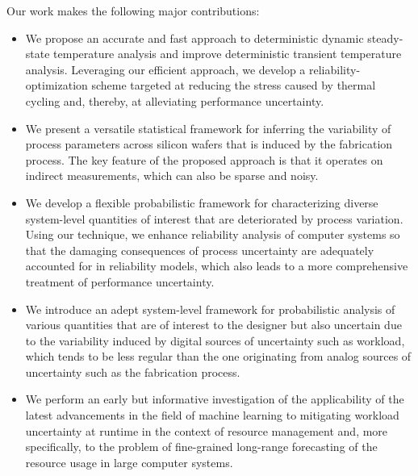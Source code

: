Our work makes the following major contributions:

\begin{itemize}

\item
We propose an accurate and fast approach to deterministic dynamic steady-state
temperature analysis and improve deterministic transient temperature analysis.
Leveraging our efficient approach, we develop a reliability-optimization scheme
targeted at reducing the stress caused by thermal cycling and, thereby, at
alleviating performance uncertainty.

\item
We present a versatile statistical framework for inferring the variability of
process parameters across silicon wafers that is induced by the fabrication
process. The key feature of the proposed approach is that it operates on
indirect measurements, which can also be sparse and noisy.

\item
We develop a flexible probabilistic framework for characterizing diverse
system-level quantities of interest that are deteriorated by process variation.
Using our technique, we enhance reliability analysis of computer systems so that
the damaging consequences of process uncertainty are adequately accounted for in
reliability models, which also leads to a more comprehensive treatment of
performance uncertainty.

\item
We introduce an adept system-level framework for probabilistic analysis of
various quantities that are of interest to the designer but also uncertain due
to the variability induced by digital sources of uncertainty such as workload,
which tends to be less regular than the one originating from analog sources of
uncertainty such as the fabrication process.

\item
We perform an early but informative investigation of the applicability of the
latest advancements in the field of machine learning to mitigating workload
uncertainty at runtime in the context of resource management and, more
specifically, to the problem of fine-grained long-range forecasting of the
resource usage in large computer systems.

\end{itemize}
